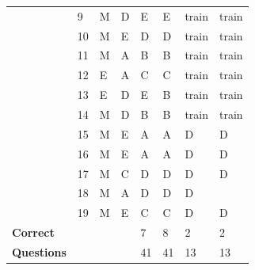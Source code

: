 \documentclass[pageno]{final_paper}
\begin{document}
\begin{table}[h]
\begin{tabularx}{\textwidth}{lXXXXXXX}
\textbf{}                & 9          & M & D     & E                       & E                      & train                   & train                       \\
\textbf{}                & 10         & M & E     & D                       & D                      & train                   & train                       \\
\textbf{}                & 11         & M & A     & B                       & B                      & train                   & train                       \\
\textbf{}                & 12         & E & A     & C                       & C                      & train                   & train                       \\
\textbf{}                & 13         & E & D     & E                       & B                      & train                   & train                       \\
\textbf{}                & 14         & M & D     & B                       & B                      & train                   & train                       \\
\textbf{}                & 15         & M & E     & A                       & A                      & D                       & D                           \\
\textbf{}                & 16         & M & E     & A                       & A                      & D                       & D                           \\
\textbf{}                & 17         & M & C     & D                       & D                      & D                       & D                           \\
\textbf{}                & 18         & M & A     & D                       & D                      & D                       & \g{A}                           \\
\textbf{}                & 19         & M & E     & C                       & C                      & D                       & D                           \\ \midrule
\textbf{Correct}         &            &   &       & 7                       & 8                      & 2                       & 2                           \\
\textbf{Questions}       &            &   &       & 41                      & 41                     & 13                      & 13                          \\ \bottomrule
\end{tabularx}
\end{table}
\end{document}

